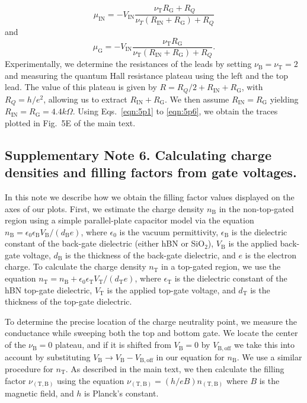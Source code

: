 \documentclass[%
reprint,amsmath,amssymb,aps,prl,superscriptaddress,
twocolumn
]{revtex4-1}
\begin{document}
		\begin{equation}
		\mu_\mathrm{IN} = -V_\mathrm{IN} \frac{\nu_\mathrm{T} R_\mathrm{G} +R_Q}{\nu_T(R_\mathrm{IN}+R_\mathrm{G})+R_Q}
		\label{eqn:5p5}
		\end{equation}
		and
		\begin{equation}
		\mu_\mathrm{G} = -V_\mathrm{IN} \frac{\nu_\mathrm{T} R_\mathrm{G}}{\nu_\mathrm{T}(R_\mathrm{IN}+R_\mathrm{G})+R_Q}.
		\label{eqn:5p6}
		\end{equation}
		Experimentally, we determine the resistances of the leads by setting $\nu_\mathrm{B} = \nu_\mathrm{T} = 2$ and measuring the quantum Hall resistance plateau using the left and the top lead. The value of this plateau is given by $R=R_Q/2+R_\mathrm{IN}+R_\mathrm{G}$, with $R_Q=h/e^2$, allowing us to extract $R_\mathrm{IN}+R_\mathrm{G}$. We then assume $R_\mathrm{IN}=R_\mathrm{G}$ yielding $R_\mathrm{IN}=R_\mathrm{G} = 4.4 k\Omega$. Using Eqs.~\ref{eqn:5p1} to \ref{eqn:5p6}, we obtain the traces plotted in Fig.~5E of the main text. 
		
		
		\subsection{Supplementary Note 6. Calculating charge densities and filling factors from gate voltages.} 
		
		In this note we describe how we obtain the filling factor values displayed on the axes of our plots. First, we estimate the charge density $n_\mathrm{B}$ in the non-top-gated region using a simple parallel-plate capacitor model via the equation $n_\mathrm{B}=\epsilon_0 \epsilon_\mathrm{B} V_\mathrm{B}/(d_\mathrm{B} e)$, where $\epsilon_0$ is the vacuum permittivity, $\epsilon_\mathrm{B}$ is the dielectric constant of the back-gate dielectric (either hBN or SiO$_2$), $V_\mathrm{B}$ is the applied back-gate voltage, $d_\mathrm{B}$ is the thickness of the back-gate dielectric, and $e$ is the electron charge. To calculate the charge density $n_\mathrm{T}$ in a top-gated region, we use the equation $n_\mathrm{T}=n_\mathrm{B}+\epsilon_0 \epsilon_\mathrm{T} V_\mathrm{T}/(d_\mathrm{T} e)$, where $\epsilon_\mathrm{T}$ is the dielectric constant of the hBN top-gate dielectric, $V_\mathrm{T}$ is the applied top-gate voltage, and $d_\mathrm{T}$ is the thickness of the top-gate dielectric. 
		
		To determine the precise location of the charge neutrality point, we measure the conductance while sweeping both the top and bottom gate. We locate the center of the $\nu_\mathrm{B}=0$ plateau, and if it is shifted from $V_\mathrm{B}=0$ by $V_{\mathrm{B},\mathrm{off}}$ we take this into account by substituting $V_\mathrm{B} \rightarrow V_\mathrm{B}-V_{\mathrm{B,off}}$ in our equation for $n_\mathrm{B}$. We use a similar procedure for $n_\mathrm{T}$. As described in the main text, we then calculate the filling factor $\nu_{(\mathrm{T,B})}$ using the equation $\nu_{(\mathrm{T,B})} =(h/eB)n_{(\mathrm{T,B})}$  where $B$ is the magnetic field, and $h$ is Planck's constant. 
		
\end{document}
